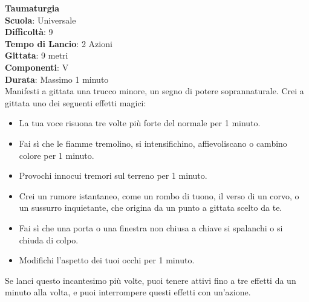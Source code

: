 \begin{multicols}{2}
\medskip\textbf{Taumaturgia}\\
\textbf{Scuola}: Universale\\
\textbf{Difficoltà}: 9\\
\textbf{Tempo di Lancio}: 2 Azioni\\
\textbf{Gittata}: 9 metri\\
\textbf{Componenti}: V\\
\textbf{Durata}: Massimo 1 minuto\\
Manifesti a gittata una trucco minore, un segno di potere soprannaturale. Crei a gittata uno dei seguenti effetti magici:
\medskip
\begin{itemize}
\item
La tua voce risuona tre volte più forte del normale per 1 minuto.
\item
Fai sì che le fiamme tremolino, si intensifichino, affievoliscano o cambino colore per 1 minuto.
\item
Provochi innocui tremori sul terreno per 1 minuto. 
\item
Crei un rumore istantaneo, come un rombo di tuono, il verso di un corvo, o un sussurro inquietante, che origina da un punto a gittata scelto da te.
\item
Fai sì che una porta o una finestra non chiusa a chiave si spalanchi o si chiuda di colpo.
\item
Modifichi l'aspetto dei tuoi occhi per 1 minuto.
\end{itemize}
\medskip
Se lanci questo incantesimo più volte, puoi tenere attivi fino a tre effetti da un minuto alla volta, e puoi interrompere questi effetti con un'azione.


\end{multicols}
